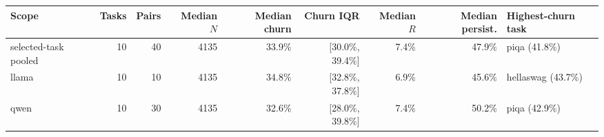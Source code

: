 \begin{tabular}{lrrrrrrrl}
\toprule
Scope & Tasks & Pairs & Median $N$ & Median churn & Churn IQR & Median $R$ & Median persist. & Highest-churn task \\
\midrule
selected-task pooled & 10 & 40 & 4135 & 33.9\% & [30.0\%, 39.4\%] & 7.4\% & 47.9\% & piqa (41.8\%) \\
llama & 10 & 10 & 4135 & 34.8\% & [32.8\%, 37.8\%] & 6.9\% & 45.6\% & hellaswag (43.7\%) \\
qwen & 10 & 30 & 4135 & 32.6\% & [28.0\%, 39.8\%] & 7.4\% & 50.2\% & piqa (42.9\%) \\
\bottomrule
\end{tabular}
